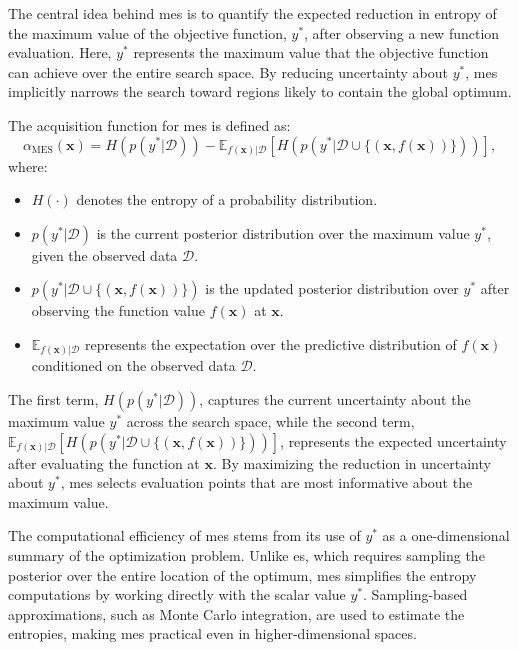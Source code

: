 The central idea behind \ac{mes} is to quantify the expected reduction in entropy of the maximum value of the objective function, $y^*$, after observing a new function evaluation. Here, $y^*$ represents the maximum value that the objective function can achieve over the entire search space. By reducing uncertainty about $y^*$, \ac{mes} implicitly narrows the search toward regions likely to contain the global optimum.

The acquisition function for \ac{mes} is defined as:
\begin{equation}
    \alpha_{\text{MES}}(\mathbf{x}) = H(p(y^* \vert \mathcal{D})) - \mathbb{E}_{f(\mathbf{x}) \vert \mathcal{D}} \left[ H(p(y^* \vert \mathcal{D} \cup \{(\mathbf{x}, f(\mathbf{x}))\})) \right],
\end{equation}
where:
\begin{itemize}
    \item $H(\cdot)$ denotes the entropy of a probability distribution.
    \item $p(y^* \vert \mathcal{D})$ is the current posterior distribution over the maximum value $y^*$, given the observed data $\mathcal{D}$.
    \item $p(y^* \vert \mathcal{D} \cup \{(\mathbf{x}, f(\mathbf{x}))\})$ is the updated posterior distribution over $y^*$ after observing the function value $f(\mathbf{x})$ at $\mathbf{x}$.
    \item $\mathbb{E}_{f(\mathbf{x}) \vert \mathcal{D}}$ represents the expectation over the predictive distribution of $f(\mathbf{x})$ conditioned on the observed data $\mathcal{D}$.
\end{itemize}

The first term, $H(p(y^* \vert \mathcal{D}))$, captures the current uncertainty about the maximum value $y^*$ across the search space, while the second term, $\mathbb{E}_{f(\mathbf{x}) \vert \mathcal{D}} \left[ H(p(y^* \vert \mathcal{D} \cup \{(\mathbf{x}, f(\mathbf{x}))\})) \right]$, represents the expected uncertainty after evaluating the function at $\mathbf{x}$. By maximizing the reduction in uncertainty about $y^*$, \ac{mes} selects evaluation points that are most informative about the maximum value.

The computational efficiency of \ac{mes} stems from its use of $y^*$ as a one-dimensional summary of the optimization problem. Unlike \ac{es}, which requires sampling the posterior over the entire location of the optimum, \ac{mes} simplifies the entropy computations by working directly with the scalar value $y^*$. Sampling-based approximations, such as Monte Carlo integration, are used to estimate the entropies, making \ac{mes} practical even in higher-dimensional spaces.

